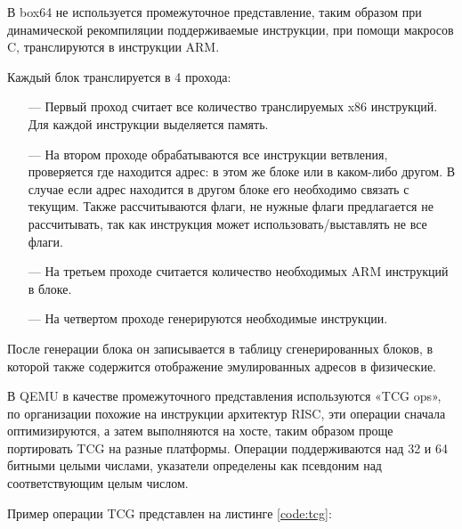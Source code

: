 В box64 не используется промежуточное представление, таким образом при динамической рекомпиляции поддерживаемые инструкции, при помощи макросов C, транслируются в инструкции ARM. \cite{box64_letter}

Каждый блок транслируется в 4 прохода:
\begin{itemize}[leftmargin=1.6\parindent]
	\item[---] Первый проход считает все количество транслируемых x86 инструкций. Для каждой инструкции выделяется память.
	\item[---] На втором проходе обрабатываются все инструкции ветвления, проверяется где находится адрес: в этом же блоке или в каком-либо другом. В случае если адрес находится в другом блоке его необходимо связать с текущим. Также рассчитываются флаги, не нужные флаги предлагается не рассчитывать, так как инструкция может использовать/выставлять не все флаги.
	\item[---] На третьем проходе считается количество необходимых ARM инструкций в блоке.
	\item[---] На четвертом проходе генерируются необходимые инструкции.
\end{itemize}

После генерации блока он записывается в таблицу сгенерированных блоков, в которой также содержится отображение эмулированных адресов в физические. \cite{box64_wide}

В QEMU в качестве промежуточного представления используются «TCG ops», по организации похожие на инструкции архитектур RISC, эти операции сначала оптимизируются, а затем выполняются на хосте, таким образом проще портировать TCG на разные платформы. Операции поддерживаются над 32 и 64 битными целыми числами, указатели определены как псевдоним над соответствующим целым числом. \cite{qemu_readme}

Пример операции TCG представлен на листинге \ref{code:tcg}:
\begin{Verbatim}

\end{Verbatim}

